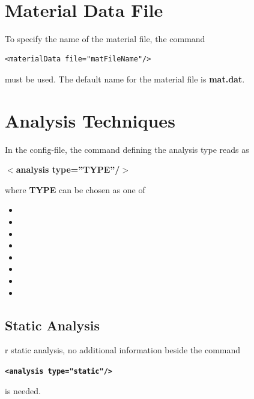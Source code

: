 \
\section{Material Data File}
To specify the name of the material file, the command 
\begin{verbatim}
<materialData file="matFileName"/>
\end{verbatim}
must be used. The default name for the material file is {\bf mat.dat}.




%
\section{Analysis Techniques}\label{subsec:Analysis}
In the config-file, the command defining the analysis type reads as

\textbf{$<$analysis type=''TYPE''/$>$}

\noindent
where {\bf TYPE} can be chosen as one of
\begin{itemize} 
\item {} 
\item {}
\item {}
\item {}
\item {}
\item {}
\item {}
\item {}
\end{itemize}


\subsection{Static Analysis}
%
%
r static analysis, no additional information beside the command

{\bf \verb!<analysis type="static"/>!}

\noindent
is needed.

